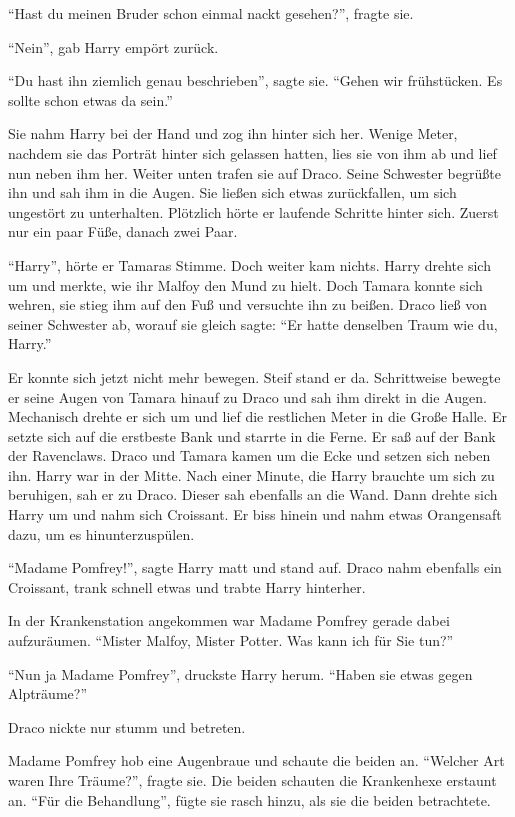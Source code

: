 \enquote{Hast du meinen Bruder schon einmal nackt gesehen?}, fragte sie.

\enquote{Nein}, gab Harry empört zurück.

\enquote{Du hast ihn ziemlich genau beschrieben}, sagte sie. \enquote{Gehen wir frühstücken. Es sollte schon etwas da sein.}

Sie nahm Harry bei der Hand und zog ihn hinter sich her. Wenige Meter, nachdem sie das Porträt hinter sich gelassen hatten, lies sie von ihm ab und lief nun neben ihm her. Weiter unten trafen sie auf Draco. Seine Schwester begrüßte ihn und sah ihm in die Augen. Sie ließen sich etwas zurückfallen, um sich ungestört zu unterhalten. Plötzlich hörte er laufende Schritte hinter sich. Zuerst nur ein paar Füße, danach zwei Paar.

\enquote{Harry}, hörte er Tamaras Stimme. Doch weiter kam nichts. Harry drehte sich um und merkte, wie ihr Malfoy den Mund zu hielt. Doch Tamara konnte sich wehren, sie stieg ihm auf den Fuß und versuchte ihn zu beißen. Draco ließ von seiner Schwester ab, worauf sie gleich sagte: \enquote{Er hatte denselben Traum wie du, Harry.}

Er konnte sich jetzt nicht mehr bewegen. Steif stand er da. Schrittweise bewegte er seine Augen von Tamara hinauf zu Draco und sah ihm direkt in die Augen. Mechanisch drehte er sich um und lief die restlichen Meter in die Große Halle. Er setzte sich auf die erstbeste Bank und starrte in die Ferne. Er saß auf der Bank der Ravenclaws. Draco und Tamara kamen um die Ecke und setzen sich neben ihn. Harry war in der Mitte. Nach einer Minute, die Harry brauchte um sich zu beruhigen, sah er zu Draco. Dieser sah ebenfalls an die Wand. Dann drehte sich Harry um und nahm sich Croissant. Er biss hinein und nahm etwas Orangensaft dazu, um es hinunterzuspülen.

\enquote{Madame Pomfrey!}, sagte Harry matt und stand auf. Draco nahm ebenfalls ein Croissant, trank schnell etwas und trabte Harry hinterher.

In der Krankenstation angekommen war Madame Pomfrey gerade dabei aufzuräumen. \enquote{Mister Malfoy, Mister Potter. Was kann ich für Sie tun?}

\enquote{Nun ja Madame Pomfrey}, druckste Harry herum. \enquote{Haben sie etwas gegen Alpträume?}

Draco nickte nur stumm und betreten.

Madame Pomfrey hob eine Augenbraue und schaute die beiden an. \enquote{Welcher Art waren Ihre Träume?}, fragte sie. Die beiden schauten die Krankenhexe erstaunt an. \enquote{Für die Behandlung}, fügte sie rasch hinzu, als sie die beiden betrachtete.

